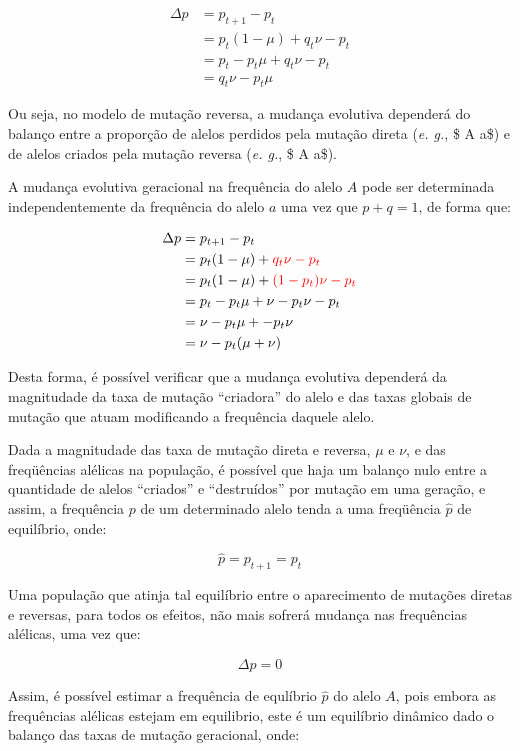\documentclass[
]{book}
\begin{document}
\[
\begin{aligned}
\Delta p
&= p_{t+1} - p_t \\
&= p_t(1- \mu) + q_t \nu - p_t \\
&= p_t - p_t \mu + q_t \nu - p_t \\
&= q_t \nu - p_t \mu
\end{aligned}
\]

Ou seja, no modelo de mutação reversa, a mudança evolutiva dependerá do balanço entre a proporção de alelos perdidos pela mutação direta (\emph{e. g.}, \$ A \overset{\mu}{\rightarrow} a\$) e de alelos criados pela mutação reversa (\emph{e. g.}, \$ A \overset{\nu}{\leftarrow} a\$).

A mudança evolutiva geracional na frequência do alelo \(A\) pode ser determinada independentemente da frequência do alelo \(a\) uma vez que \(p+q=1\), de forma que:

\[
\begin{aligned}
\Delta p
&= p_{t+1} - p_t \\
&= p_t(1- \mu) + \color{red}{q_t} \nu - p_t \\
&= p_t(1- \mu) + \color{red}{(1-p_t)} \nu - p_t \\
&= p_t - p_t \mu + \nu - p_t \nu - p_t \\
&= \nu - p_t \mu + - p_t \nu \\
&= \nu - p_t (\mu + \nu)
\end{aligned}
\]

Desta forma, é possível verificar que a mudança evolutiva dependerá da magnitudade da taxa de mutação ``criadora'' do alelo e das taxas globais de mutação que atuam modificando a frequência daquele alelo.

Dada a magnitudade das taxa de mutação direta e reversa, \(\mu\) e \(\nu\), e das freqüências alélicas na população, é possível que haja um balanço nulo entre a quantidade de alelos ``criados'' e ``destruídos'' por mutação em uma geração, e assim, a frequência \(p\) de um determinado alelo tenda a uma freqüência \(\hat{p}\) de equilíbrio, onde:

\[ \hat{p} = p_{t+1} = p_t \]

Uma população que atinja tal equilíbrio entre o aparecimento de mutações diretas e reversas, para todos os efeitos, não mais sofrerá mudança nas frequências alélicas, uma vez que:

\[ \Delta \hat{p} = 0 \]

Assim, é possível estimar a frequência de equlíbrio \(\hat{p}\) do alelo \(A\), pois embora as frequências alélicas estejam em equilibrio, este é um equilíbrio dinâmico dado o balanço das taxas de mutação geracional, onde:
\end{document}

